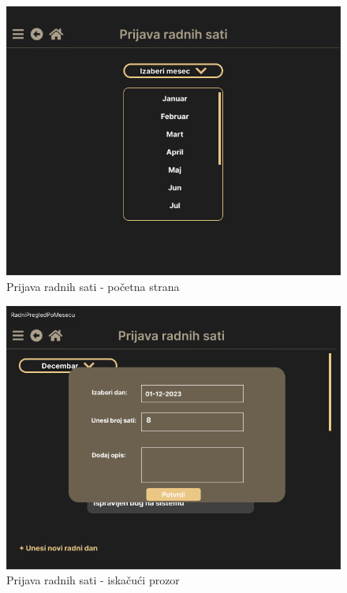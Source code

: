 \documentclass[a4paper]{article}
\begin{document}
\begin{figure} [!ht]
    \begin{center}
        \includegraphics[scale=0.25]{UI/Zaposleni/RadniSatiPocetna.png}
    \end{center}
\caption{Prijava radnih sati - početna strana}
\end{figure}

\begin{figure} [!ht]
    \begin{center}
        \includegraphics[scale=0.25]{UI/Zaposleni/RadniSatiPopup.png}
    \end{center}
\caption{Prijava radnih sati - iskačući prozor}
\end{figure}
\end{document}
